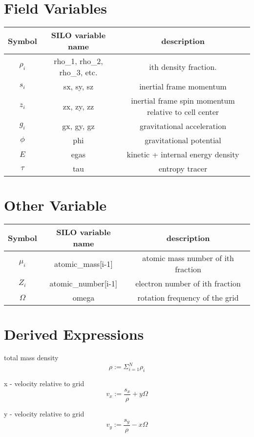 \documentclass{article}
\begin{document}
\section{ Field Variables }
\begin{tabular}{|c|c|c|}
\hline
Symbol & SILO variable name & description \\
\hline
$\rho_i$ & rho\_1, rho\_2, rho\_3, etc. & ith density fraction. \\
$s_i$ & sx, sy, sz & inertial frame momentum \\
$z_i$ & zx, zy, zz & inertial frame spin momentum relative to cell center \\
$g_i$ & gx, gy, gz & gravitational acceleration \\
$\phi$ & phi & gravitational potential \\
$E$ & egas & kinetic + internal energy density \\
$\tau$ & tau & entropy tracer \\
\hline
\end{tabular}

\section{ Other Variable}

\begin{tabular}{|c|c|c|}
\hline
Symbol & SILO variable name & description \\
\hline
$\mu_i$ & atomic\_mass[i-1]  & atomic mass number of ith fraction \\ 
$Z_i$ & atomic\_number[i-1]  & electron number of ith fraction \\ 
$\Omega$ & omega & rotation frequency of the grid \\
\hline
\end{tabular}


\section{Derived Expressions}

total mass density
\begin{equation}
\rho := \Sigma_{i=1}^N \rho_i 
\end{equation}

x - velocity relative to grid
\begin{equation}
v_x  := \frac{s_x}{\rho} + y \Omega 
\end{equation}

y - velocity relative to grid
\begin{equation}
v_y  := \frac{s_y}{\rho} - x \Omega 
\end{equation}
\end{document}
